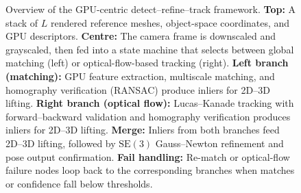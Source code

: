 \begin{figure}[p]
{\begin{tikzpicture}[x=1cm, y=1cm]
\end{tikzpicture}
}
\caption{%
Overview of the GPU-centric detect--refine--track framework.
\textbf{Top:} A stack of $L$ rendered reference meshes, object-space coordinates, and GPU descriptors.
\textbf{Centre:} The camera frame is downscaled and grayscaled, then fed into a state machine that selects between global matching (left) or optical-flow-based tracking (right).
\textbf{Left branch (matching):} GPU feature extraction, multiscale matching, and homography verification (RANSAC) produce inliers for 2D--3D lifting.
\textbf{Right branch (optical flow):} Lucas--Kanade tracking with forward--backward validation and homography verification produces inliers for 2D--3D lifting.
\textbf{Merge:} Inliers from both branches feed 2D--3D lifting, followed by $\mathrm{SE}(3)$ Gauss--Newton refinement and pose output confirmation.
\textbf{Fail handling:} Re-match or optical-flow failure nodes loop back to the corresponding branches when matches or confidence fall below thresholds.
}
\label{fig:pipeline}
\end{figure}
